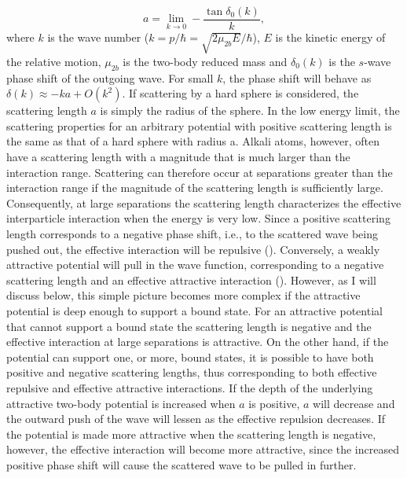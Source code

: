 \begin{equation} \label{eq:2}
a = \lim_{k \to 0} -\frac{\tan\delta_0(k)}{k},
\end{equation}
where $k$ is the wave number ($k=p/\hbar = \sqrt{2\mu_{2b} E}/\hbar$), $E$ is the kinetic energy of the relative motion, $\mu_{2b}$ is the two-body reduced mass and $\delta_0(k)$ is the $s$-wave phase shift of the outgoing wave. For small $k$, the phase shift will behave as $\delta(k)\approx-ka + O(k^2)$. If scattering by a hard sphere is considered, the scattering length $a$ is simply the radius of the sphere. In the low energy limit, the scattering properties for an arbitrary potential with positive scattering length is the same as that of a hard sphere with radius a. Alkali atoms, however, often have a scattering length with a magnitude that is much larger than the interaction range. Scattering can therefore occur at separations greater than the interaction range if the magnitude of the scattering length is sufficiently large. Consequently, at large separations the scattering length characterizes the effective interparticle interaction when the energy is very low. Since a positive scattering length corresponds to a negative phase shift, i.e., to the scattered wave being pushed out, the effective interaction will be repulsive (). Conversely, a weakly attractive potential will pull in the wave function, corresponding to a negative scattering length and an effective attractive interaction (). However, as I will discuss below, this simple picture becomes more complex if the attractive potential is deep enough to support a bound state. For an attractive potential that cannot support a bound state the scattering length is negative and the effective interaction at large separations is attractive. On the other hand, if the potential can support one, or more, bound states, it is possible to have both positive and negative scattering lengths, thus corresponding to both effective repulsive and effective attractive interactions. If the depth of the underlying attractive two-body potential is increased when $a$ is positive, $a$ will decrease and the outward push of the wave will lessen as the effective repulsion decreases. If the potential is made more attractive when the scattering length is negative, however, the effective interaction will become more attractive, since the increased positive phase shift will cause the scattered wave to be pulled in further. 

